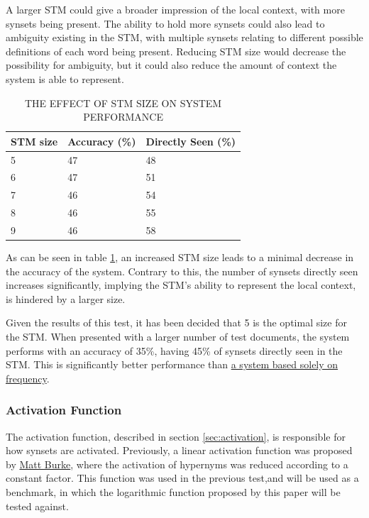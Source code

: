 \documentclass[]{article}
\begin{document}
A larger STM could give a broader impression of the local context, with more synsets being present. The ability to hold more synsets could also lead to ambiguity existing in the STM, with multiple synsets relating to different possible definitions of each word being present. Reducing STM size would decrease the possibility for ambiguity, but it could also reduce the amount of context the system is able to represent.

\begin{table}
\begin{center}
\begin{tabular}{|p{8em}|p{8em}|p{8em}|}
	\hline
	STM size & Accuracy (\%) & Directly Seen (\%) \\
	\hline
	5 & 47 & 48\\
	\hline
	6 & 47 & 51\\
	\hline
	7 & 46 & 54\\
	\hline
	8 & 46 & 55\\
	\hline
	9 & 46 & 58\\
	\hline
\end{tabular}
\end{center}
\caption{THE EFFECT OF STM SIZE ON SYSTEM PERFORMANCE}
\label{table:STMSize}
\end{table}

As can be seen in table \ref{table:STMSize}, an increased STM size leads to a minimal decrease in the accuracy of the system. Contrary to this, the number of synsets directly seen increases significantly, implying the STM's ability to represent the local context, is hindered by a larger size.

Given the results of this test, it has been decided that 5 is the optimal size for the STM. When presented with a larger number of test documents, the system performs with an accuracy of 35\%, having 45\% of synsets directly seen in the STM. This is significantly better performance than \hyperref[sec:EvFrequency]{ a system based solely on frequency}.

\subsubsection{Activation Function}
\label{sec:EvActivation}
The activation function, described in section \ref{sec:activation}, is responsible for how synsets are activated. Previously, a linear activation function was proposed by \hyperref[sec:MattBurke]{Matt Burke}, where the activation of hypernyms was reduced according to a constant factor. This function was used in the previous test,and will be used as a benchmark, in which the logarithmic function proposed by this paper will be tested against. 
\end{document}
